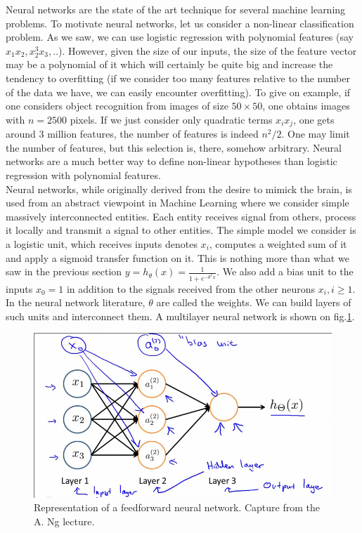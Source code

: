 \documentclass[10pt,a4paper]{article}
\begin{document}
Neural networks are the state of the art technique for several machine
learning problems. To motivate neural networks, let us consider a
non-linear classification problem. As we saw, we can use logistic
regression with polynomial features (say $x_1 x_2, x_2^3 x_3,
..$). However, given the size of our inputs, the size of the feature
vector may be a polynomial of it which will certainly be quite big and
increase the tendency to overfitting (if we consider too many features
relative to the number of the data we have, we can easily encounter
overfitting). To give on example, if one considers object recognition
from images of size $50 \times 50$, one obtains images with $n=2500$
pixels. If we just consider only quadratic terms $x_i x_j$, one gets
around $3$ million features, the number of features is indeed
$n^2/2$. One may limit the number of features, but this selection
is, there, somehow arbitrary. Neural networks are a much better way to
define non-linear hypotheses than logistic regression with polynomial
features.\\


Neural networks, while originally derived from the desire to mimick
the brain, is used from an abstract viewpoint in Machine Learning
where we consider simple massively interconnected entities. Each
entity receives signal from others, process it locally and transmit a
signal to other entities. The simple model we consider is a logistic
unit, which receives inputs denotes $x_i$, computes a weighted sum of
it and apply a sigmoid transfer function on it. This is nothing more than what
we saw in the previous section $y = h_\theta(x) = \frac{1}{1 +
  e^{-\theta^T x}}$. We also add a bias unit to the inputs $x_0 = 1$
in addition to the signals received from the other neurons $x_i, i
\geq 1$. In the neural network literature, $\theta$ are called the
weights. We can build layers of such units and interconnect them. A
multilayer neural network is shown on fig.\ref{fig:neunet}.

\begin{figure}[htbp]
\includegraphics[width=0.7\columnwidth]{Figs/neunet.png}
\caption{\label{fig:neunet} Representation of a feedforward neural
  network. Capture from the A. Ng lecture.}
\end{figure}
\end{document}
